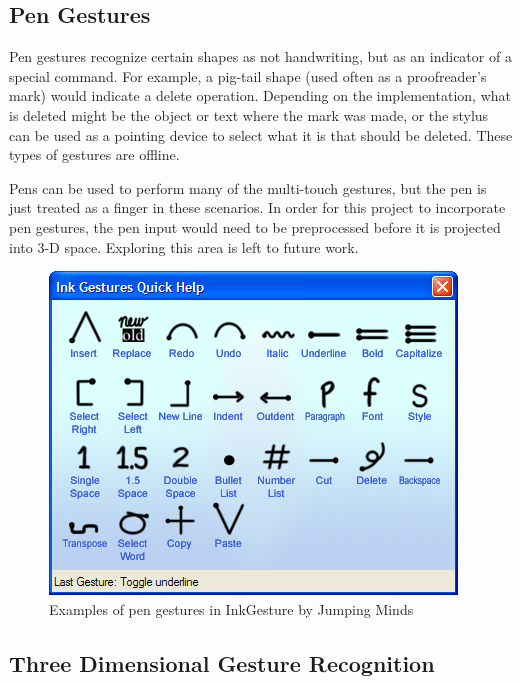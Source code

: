 \documentclass[11pt]{report}
\begin{document}
\subsection{Pen Gestures}

Pen gestures recognize certain shapes as not handwriting, but as an indicator of a special command.
For example, a pig-tail shape (used often as a proofreader's mark) would indicate a delete operation. 
Depending on the implementation, what is deleted might be the object or text where the mark was made, or the stylus can be used as a pointing device to select what it is that should be deleted.
These types of gestures are offline.

Pens can be used to perform many of the multi-touch gestures, but the pen is just treated as a finger in these scenarios.
In order for this project to incorporate pen gestures, the pen input would need to be preprocessed before it is projected into 3-D space.
Exploring this area is left to future work.

\begin{figure}
\includegraphics[width=\textwidth]{pen-gestures}
\caption{Examples of pen gestures in InkGesture by Jumping Minds}
\end{figure}

\subsection{Three Dimensional Gesture Recognition}
\end{document}
